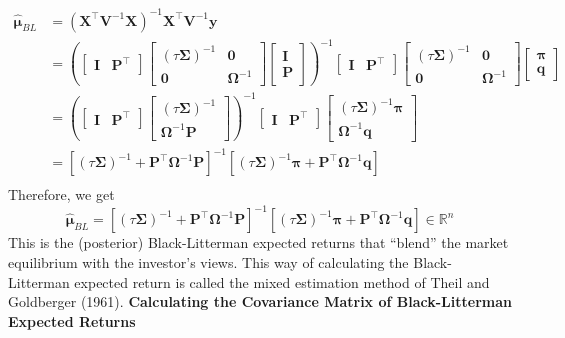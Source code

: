\documentclass[13pt]{article}
\theoremstyle{definition}
\theoremstyle{remark}
\newenvironment{remark}
  {\pushQED{\qed}\renewcommand{\qedsymbol}{$\triangle$}\remarkx}
  {\popQED\endremarkx}
\begin{document}
$$
\begin{aligned}
\bm{\hat{\bm{\mu}}}_{BL} & =\left(\mathbf{X}^\top \mathbf{V}^{-1} \mathbf{X}\right)^{-1} \mathbf{X}^\top \mathbf{V}^{-1} \bm{y} \\
& =\left(\begin{bmatrix}
\mathbf{I} & \mathbf{P}^\top
\end{bmatrix} \begin{bmatrix}
(\tau \mathbf{\Sigma})^{-1} & \bm{0}\\
\bm{0} & \mathbf{\Omega}^{-1}
\end{bmatrix}\begin{bmatrix}
\mathbf{I} \\
\mathbf{P}
\end{bmatrix}\right)^{-1}\begin{bmatrix}
\mathbf{I} & \mathbf{P}^\top
\end{bmatrix}\begin{bmatrix}
(\tau \mathbf{\Sigma})^{-1} & \bm{0}\\
\bm{0} & \mathbf{\Omega}^{-1}
\end{bmatrix}\begin{bmatrix}
\bm{\pi} \\
\bm{q}
\end{bmatrix} \\
& =\left(\begin{bmatrix}
\mathbf{I} & \mathbf{P}^\top
\end{bmatrix}\begin{bmatrix}
(\tau \mathbf{\Sigma})^{-1} \\
\mathbf{\Omega}^{-1} \mathbf{P}
\end{bmatrix}\right)^{-1}\begin{bmatrix}
\mathbf{I} & \mathbf{P}^\top
\end{bmatrix}\begin{bmatrix}
(\tau \mathbf{\Sigma})^{-1} \bm{\pi} \\
\mathbf{\Omega}^{-1} \bm{q}
\end{bmatrix} \\
& =\left[(\tau \mathbf{\Sigma})^{-1}+\mathbf{P}^\top \mathbf{\Omega}^{-1} \mathbf{P}\right]^{-1}\left[(\tau \mathbf{\Sigma})^{-1} \bm{\pi}+\mathbf{P}^\top \mathbf{\Omega}^{-1} \bm{q}\right] \\
\end{aligned}
$$
Therefore, we get
\[
\bm{\hat{\bm{\mu}}}_{BL} =\left[(\tau \mathbf{\Sigma})^{-1}+\mathbf{P}^\top \mathbf{\Omega}^{-1} \mathbf{P}\right]^{-1}\left[(\tau \mathbf{\Sigma})^{-1} \bm{\pi}+\mathbf{P}^\top \mathbf{\Omega}^{-1} \bm{q}\right] \in\mathbb{R}^n
\]
This is the (posterior) Black-Litterman expected returns that ``blend'' the market equilibrium with the investor's views.
\begin{remark}
    This way of calculating the Black-Litterman expected return is called the mixed estimation method of Theil and Goldberger (1961)\cite{theil_goldberger_1961}.
\end{remark}
{\color{C6}\textbf{Calculating the Covariance Matrix of Black-Litterman Expected Returns}}
\end{document}
